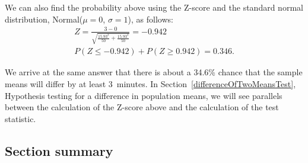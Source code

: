 We can also find the probability above using the Z-score and the standard normal distribution, Normal($\mu=0$, $\sigma=1$), as follows:
\begin{align*}
Z =  \frac{3 - 0}{\sqrt{\frac{15.93^2}{50} + \frac{15.93^2}{50}}}=-0.942\\
P(Z \le -0.942) + P(Z \ge 0.942) = 0.346.
\end{align*}
\begin{center}
\end{center}
We arrive at the same answer that there is about a 34.6\% chance that the sample means will differ by at least 3~minutes.  In Section~\ref{differenceOfTwoMeansTest}, Hypothesis testing for a difference in population means, we will see parallels between the calculation of the Z-score above and the calculation of the test statistic. 

\D{\newpage}

\subsection*{Section summary}

